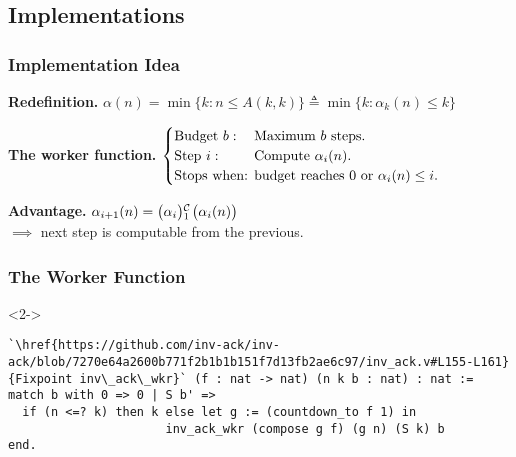 \subsection{Implementations}
\begin{frame}
\frametitle{Implementation Idea}
\textbf{Redefinition.}
$
\alpha(n) = \min\{k: n\le A(k, k) \} \triangleq \min\{k: \alpha_k(n)\le k \}
$

\bigskip

\pause 
\textbf{The worker function.} $\begin{cases}
\text{Budget } b: & \hspace{-1em}\text{Maximum } b \text{ steps. } \\
\text{Step } i: & \hspace{-1em}\text{Compute } \alpha_i(n). \\
\text{Stops when: } & \hspace{-1em}\text{budget reaches } 0 \text{ or } \alpha_i(n) \le i.
\end{cases}$


\bigskip

\pause 
\textbf{Advantage.} $\alpha_{i+1}(n) = \cdt{\big(\alpha_i\big)}{1}\big(\alpha_i(n)\big)$\\
\smallskip
$\implies$ next step is computable from the previous.
\end{frame}


\begin{frame}[fragile]
\frametitle{The Worker Function}


\bigskip

\begin{overlayarea}{\linewidth}{3cm}
\begin{onlyenv}<2->
	\begin{lstlisting}
`\href{https://github.com/inv-ack/inv-ack/blob/7270e64a2600b771f2b1b1b151f7d13fb2ae6c97/inv_ack.v#L155-L161} {Fixpoint inv\_ack\_wkr}` (f : nat -> nat) (n k b : nat) : nat :=
match b with 0 => 0 | S b' =>
  if (n <=? k) then k else let g := (countdown_to f 1) in
                      inv_ack_wkr (compose g f) (g n) (S k) b
end.
\end{lstlisting}
\end{onlyenv}
\end{overlayarea}

\end{frame}



